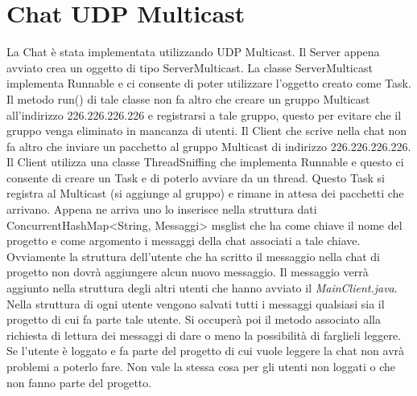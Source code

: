 \documentclass{article} %
\begin{document}
\section{Chat UDP Multicast}
La Chat è stata implementata utilizzando UDP Multicast. Il Server appena avviato crea un oggetto di tipo ServerMulticast. La classe ServerMulticast implementa Runnable e ci consente di poter utilizzare l'oggetto creato come Task. Il metodo run() di tale classe non fa altro che creare un gruppo Multicast all'indirizzo 226.226.226.226 e registrarsi a tale gruppo, questo per evitare che il gruppo venga eliminato in mancanza di utenti. Il Client che scrive nella chat non fa altro che inviare un pacchetto al gruppo Multicast di indirizzo 226.226.226.226. Il Client utilizza una classe ThreadSniffing che implementa Runnable e questo ci consente di creare un Task e di poterlo avviare da un thread. Questo Task si registra al Multicast (si aggiunge al gruppo) e rimane in attesa dei pacchetti che arrivano. Appena ne arriva uno lo inserisce nella struttura dati ConcurrentHashMap<String, Messaggi> msglist che ha come chiave il nome del progetto e come argomento i messaggi della chat associati a tale chiave. Ovviamente la struttura dell'utente che ha scritto il messaggio nella chat di progetto non dovrà aggiungere alcun nuovo messaggio. Il messaggio verrà aggiunto nella struttura degli altri utenti che hanno avviato il {\itshape MainClient.java}. Nella struttura di ogni utente vengono salvati tutti i messaggi qualsiasi sia il progetto di cui fa parte tale utente. Si occuperà poi il metodo associato alla richiesta di lettura dei messaggi di dare o meno la possibilità di farglieli leggere. Se l'utente è loggato e fa parte del progetto di cui vuole leggere la chat non avrà problemi a poterlo fare. Non vale la stessa cosa per gli utenti non loggati o che non fanno parte del progetto.  
\end{document}
